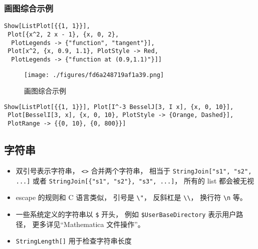 \subsubsection{画图综合示例}
\begin{lstlisting}[language=mma]
Show[ListPlot[{{1, 1}}],
 Plot[{x^2, 2 x - 1}, {x, 0, 2},
  PlotLegends -> {"function", "tangent"}],
 Plot[x^2, {x, 0.9, 1.1}, PlotStyle -> Red, 
  PlotLegends -> {"function at (0.9,1.1)"}]]
\end{lstlisting}
\begin{figure}[ht]
\centering
\texttt{[image: ./figures/fd6a248719af1a39.png]}
\caption{画图综合示例} \label{fig_Mma_1}
\end{figure}

\begin{lstlisting}[language=mma]
Show[ListPlot[{{1, 1}}], Plot[I^-3 BesselJ[3, I x], {x, 0, 10}], 
 Plot[BesselI[3, x], {x, 0, 10}, PlotStyle -> {Orange, Dashed}], 
 PlotRange -> {{0, 10}, {0, 800}}]
\end{lstlisting}

\subsection{字符串}
\begin{itemize}
\item 双引号表示字符串， \verb|<>| 合并两个字符串， 相当于 \verb|StringJoin["s1", "s2", ...]| 或者 \verb|StringJoin[{"s1", "s2"}, "s3", ...]|， 所有的 list 都会被无视
\item escape 的规则和 C 语言类似， 引号是 \verb|\"|， 反斜杠是 \verb|\\|， 换行符 \verb|\n| 等。
\item 一些系统定义的字符串以 \verb|$| 开头， 例如 \verb|$UserBaseDirectory| 表示用户路径， 更多详见“Mathematica 文件操作”。
\item \verb|StringLength[]| 用于检查字符串长度
\end{itemize}

